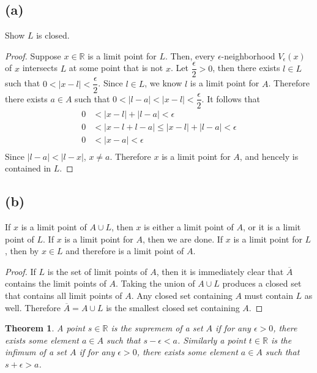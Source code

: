 \documentclass{article}
\newtheorem{theorem}{Theorem}
\begin{document}
\subsection*{(a)}
Show $L$ is closed.
\begin{proof}
Suppose $x \in \mathbb{R}$ is a limit point for $L$. Then, every $\epsilon$-neighborhood $V_{\epsilon}(x)$ of $x$ intersects $L$ at some point that is not $x$. Let $\dfrac{\epsilon}{2} > 0$, then there exists $l \in L$ such that $0 < |x-l| < \dfrac{\epsilon}{2}$. Since $l \in L$, we know $l$ is a limit point for $A$. Therefore there exists $a \in A$ such that $0 < |l - a| < |x-l| < \dfrac{\epsilon}{2}$. It follows that
\begin{align*}
0 & < |x-l| + |l-a| < \epsilon \\
0 & < |x-l+l-a| \leqslant |x-l| + |l-a| <  \epsilon \\
0 & < |x - a| <  \epsilon \\
\end{align*}
Since $|l - a| < |l-x|$, $x \neq a$. Therefore $x$ is a limit point for $A$, and hencely is contained in $L$.

\end{proof}

\subsection*{(b)}
If $x$ is a limit point of $A \cup L$, then $x$ is either a limit point of $A$, or it is a limit point of $L$. If $x$ is a limit point for $A$, then we are done. If $x$ is a limit point for $L$, then by  $x \in L$ and therefore is a limit point of $A$.
\begin{proof} If $L$ is the set of limit points of $A$, then it is immediately clear that $\overline{A}$ contains the limit points of $A$. Taking the union of $A \cup L$ produces a closed set that contains all limit points of $A$. Any closed set containing $A$ must contain $L$ as well. Therefore $\overline{A} = A \cup L$ is the smallest closed set containing $A$.

\end{proof}

\begin{theorem}
A point $s \in \mathbb{R}$ is the supremem of a set $A$ if for any $\epsilon > 0$, there exists some element $a \in A$ such that $s- \epsilon < a$. Similarly a point $t \in \mathbb{R}$ is the infimum of a set $A$ if for any $\epsilon > 0$, there exists some element $a \in A$ such that $s + \epsilon > a$.
\end{theorem} 
\end{document}
